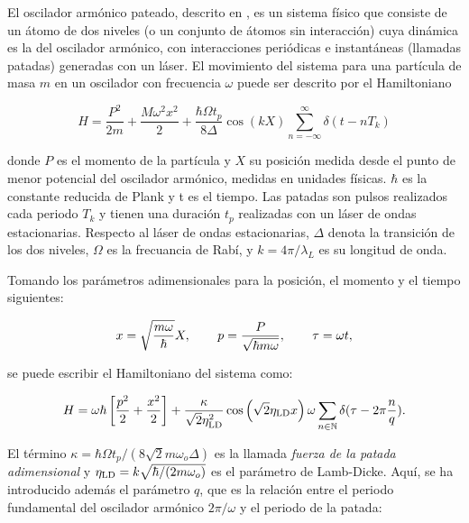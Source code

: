 \documentclass[letterpaper,12pt,oneside]{book}
\begin{document}
	El oscilador arm\'onico pateado, descrito en \cite{GardinerDeltaKicked, PradoTesis}, es un sistema f\'isico que consiste de un \'atomo de dos niveles (o un conjunto de \'atomos sin interacci\'on) cuya din\'amica es la del oscilador arm\'onico, con interacciones peri\'odicas e instant\'aneas (llamadas patadas) generadas con un l\'aser. El movimiento del sistema para una part\'icula de masa $m$ en un oscilador con frecuencia $\omega$ puede ser descrito por el Hamiltoniano
	
	\begin{equation}
		H = \frac{P^2}{2m} + \frac{M\omega^2x^2}{2} + \frac{\hbar\Omega t_p}{8\Delta}\cos(kX)\sum_{n=-\infty}^{\infty}\delta(t-nT_k)
	\end{equation}
	
	\noindent donde $P$ es el momento de la part\'icula y $X$ su posici\'on medida desde el punto de menor potencial del oscilador arm\'onico, medidas en unidades f\'isicas. $\hbar$ es la constante reducida de Plank y t es el tiempo. Las patadas son pulsos realizados cada periodo $T_k$ y tienen una duraci\'on $t_p$ realizadas con un l\'aser de ondas estacionarias. Respecto al l\'aser de ondas estacionarias, $\Delta$ denota la transici\'on de los dos niveles, $\Omega$ es la frecuancia de Rab\'i, y $k=4\pi / \lambda_L$ es su longitud de onda.
	
	 Tomando los par\'ametros adimensionales para la posici\'on, el momento y el tiempo siguientes:
	
	\begin{equation}\label{CambioVariables}
		x = \sqrt{\frac{m\omega}{\hbar}}X, \verb|    | p = \frac{P}{\sqrt{\hbar m \omega}}, \verb|    | \tau = \omega t,
	\end{equation}
	
	\noindent se puede escribir el Hamiltoniano del sistema como:
	
	\begin{equation}\label{Hamiltoniano}
	H = \omega \hbar \left[ \frac{p^2}{2} + \frac{x^2}{2} \right] + \frac{\kappa}{\sqrt{2}\eta_{\rm LD}^2} \cos \left( \sqrt{2}\eta_{\rm LD} x  \right) \omega\sum_{n\in\mathbb{N}}\delta(\tau - 2\pi\frac{n}{q}).
	\end{equation}
	
	El t\'ermino $\kappa = \hbar\Omega t_p / (8\sqrt{2}m\omega_o\Delta) $ es la llamada \textit{fuerza de la patada adimensional} y $\eta_{\rm LD} = k\sqrt{\hbar/(2m\omega_o)}$ es el par\'ametro de Lamb-Dicke. Aqu\'i, se ha introducido adem\'as el par\'ametro $q$, que es la relaci\'on entre el periodo fundamental del oscilador arm\'onico $2\pi/\omega$  y el periodo de la patada:
	
\end{document}
